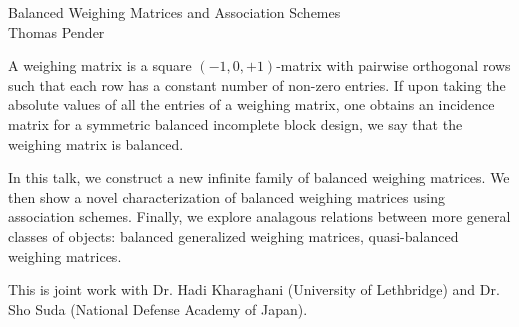 \documentclass[a4paper,11pt]{article}
\begin{document}
\begin{center}
  {\Large Balanced Weighing Matrices and Association Schemes} \\
  \vspace*{3mm}
  Thomas Pender
\end{center}

A weighing matrix is a square $(-1,0,+1)$-matrix with pairwise orthogonal rows
such that each row has a constant number of non-zero entries. If upon taking the
absolute values of all the entries of a weighing matrix, one obtains an
incidence matrix for a symmetric balanced incomplete block design, we say that
the weighing matrix is balanced.

In this talk, we construct a new infinite family of balanced weighing matrices.
We then show a novel characterization of balanced weighing matrices using
association schemes. Finally, we explore analagous relations between more general
classes of objects: balanced generalized weighing matrices, quasi-balanced
weighing matrices.

This is joint work with Dr. Hadi Kharaghani (University of Lethbridge) and Dr.
Sho Suda (National Defense Academy of Japan).
\end{document}
